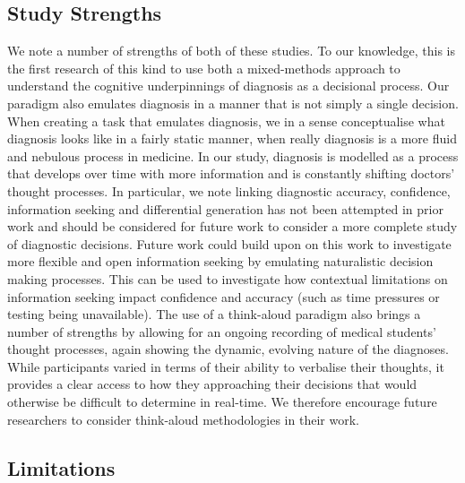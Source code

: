 \documentclass[a4paper, nobind]{templates/ociamthesis}
\begin{document}
\hypertarget{study-strengths}{%
\subsection*{Study Strengths}\label{study-strengths}}

We note a number of strengths of both of these studies. To our knowledge, this is the first research of this kind to use both a mixed-methods approach to understand the cognitive underpinnings of diagnosis as a decisional process. Our paradigm also emulates diagnosis in a manner that is not simply a single decision. When creating a task that emulates diagnosis, we in a sense conceptualise what diagnosis looks like in a fairly static manner, when really diagnosis is a more fluid and nebulous process in medicine. In our study, diagnosis is modelled as a process that develops over time with more information and is constantly shifting doctors' thought processes. In particular, we note linking diagnostic accuracy, confidence, information seeking and differential generation has not been attempted in prior work and should be considered for future work to consider a more complete study of diagnostic decisions. Future work could build upon on this work to investigate more flexible and open information seeking by emulating naturalistic decision making processes. This can be used to investigate how contextual limitations on information seeking impact confidence and accuracy (such as time pressures or testing being unavailable). The use of a think-aloud paradigm also brings a number of strengths by allowing for an ongoing recording of medical students' thought processes, again showing the dynamic, evolving nature of the diagnoses. While participants varied in terms of their ability to verbalise their thoughts, it provides a clear access to how they approaching their decisions that would otherwise be difficult to determine in real-time. We therefore encourage future researchers to consider think-aloud methodologies in their work.

\hypertarget{limitations}{%
\subsection*{Limitations}\label{limitations}}
\end{document}
